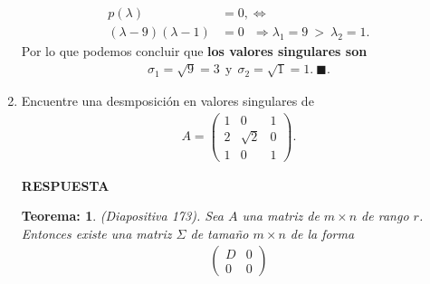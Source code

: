 \documentclass[11pt,letterpaper]{article}
\newcommand{\res}{\textbf{RESPUESTA}\\}
\newcommand{\finf}{\blacksquare.}
\newtheorem{thmt}{Teorema:}
\begin{document}
\begin{enumerate}
\begin{align*}
p(\lambda)&=0,\Leftrightarrow\\
(\lambda-9)(\lambda-1)&=0\ \ \ \Rightarrow \lambda_1=9\ >\ \lambda_2=1.
\end{align*}
Por lo que podemos concluir que \textbf{los valores singulares son}
\begin{align*}
\sigma_1=\sqrt{9}=3 \ \ \text{y} \ \ \sigma_2=\sqrt{1}=1.\ \finf  
\end{align*}
\item Encuentre una desmposición en valores singulares de 
\begin{align*}
A=\begin{pmatrix}
1 & 0 & 1\\
2 & \sqrt{2} & 0\\
1 & 0 & 1
\end{pmatrix}.
\end{align*}


\res \begin{framed}
    \begin{thmt} \label{t_descompo_valores_singulares}
	(Diapositiva 173). Sea $A$ una matriz de $m\times n$ de rango $r$. Entonces existe una matriz $\Sigma$ de tamaño $m \times n$ de la forma 
	\begin{align*}
	\begin{pmatrix}
	D & 0\\
	0 & 0
	\end{pmatrix}
	\end{align*}


\end{thmt}
\end{framed}
\end{enumerate}
\end{document}
